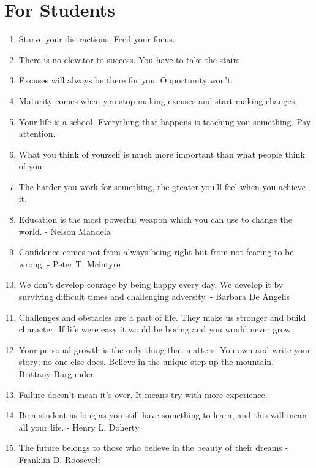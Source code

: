     \section*{For Students}
        \begin{enumerate}
            \item Starve your distractions. Feed your focus.

            \item There is no elevator to success. You have to take the stairs.

            \item Excuses will always be there for you. Opportunity won’t.

            \item Maturity comes when you stop making excuses and start making changes.

            \item Your life is a school. Everything that happens is teaching you something. Pay attention.

            \item What you think of yourself is much more important than what people think of you.

            \item The harder you work for something, the greater you’ll feel when you achieve it.

            \item Education is the most powerful weapon which you can use to change the world. - Nelson Mandela

            \item Confidence comes not from always being right but from not fearing to be wrong. - Peter T. Mcintyre

            \item We don’t develop courage by being happy every day. We develop it by surviving difficult times and challenging adversity. - Barbara De Angelis

            \item Challenges and obstacles are a part of life. They make us stronger and build character. If life were easy it would be boring and you would never grow.

            \item Your personal growth is the only thing that matters. You own and write your story; no one else does. Believe in the unique step up the mountain. - Brittany Burgunder

            \item Failure doesn’t mean it’s over. It means try with more experience.

            \item Be a student as long as you still have something to learn, and this will mean all your life. - Henry L. Doherty

            \item The future belongs to those who believe in the beauty of their dreams - Franklin D. Roosevelt
        \end{enumerate}

